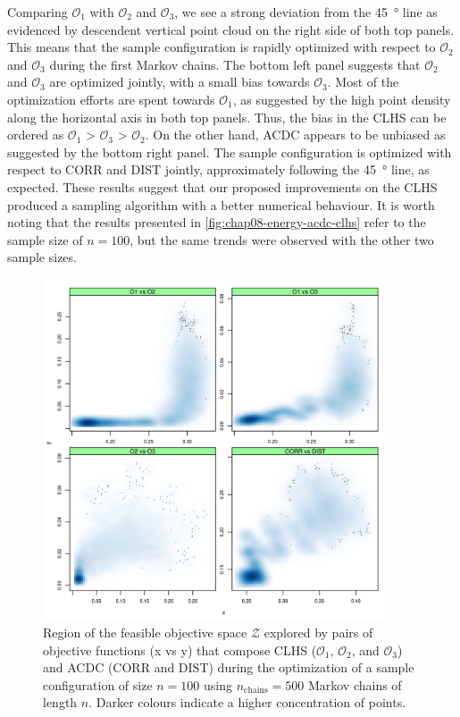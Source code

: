 Comparing $\mathcal{O}_1$ with $\mathcal{O}_2$ and $\mathcal{O}_3$, we see a strong deviation from the 
\SI{45}{\degree} line as evidenced by descendent vertical point cloud on the right side of both top panels. 
This means that the sample configuration is rapidly optimized with respect to $\mathcal{O}_2$ and 
$\mathcal{O}_3$ during the first Markov chains. The bottom left panel suggests that $\mathcal{O}_2$ and 
$\mathcal{O}_3$ are optimized jointly, with a small bias towards $\mathcal{O}_3$. Most of the optimization 
efforts are spent towards $\mathcal{O}_1$, as suggested by the high point density along the horizontal axis in 
both 
top panels. Thus, the bias in the CLHS can be ordered as $\mathcal{O}_1$ > $\mathcal{O}_3$ > $\mathcal{O}_2$. 
On the other hand, ACDC appears to be unbiased as suggested by the bottom right panel. The sample configuration 
is optimized with respect to CORR and DIST jointly, approximately following the \SI{45}{\degree} line, as 
expected. These results suggest that our proposed improvements on the CLHS produced a sampling algorithm with a 
better numerical behaviour. It is worth noting that the results presented in 
\autoref{fig:chap08-energy-acdc-clhs} refer to the sample size of $n = 100$, but the same trends were observed 
with the other two sample sizes.

\begin{figure}[!ht]
 \centering
 \includegraphics[width=0.90\textwidth]{fig/chap08-energy-acdc-clhs}
 \caption[Region of the feasible objective space explored by pairs of objective functions that compose CLHS 
 and ACDC.]{Region of the feasible objective space $\mathcal{Z}$ explored by pairs of objective functions (x 
 vs  y) that compose CLHS ($\mathcal{O}_1$, $\mathcal{O}_2$, and $\mathcal{O}_3$) and ACDC (CORR and DIST)  
 during the optimization of a sample configuration of size $n = 100$ using $n_{\text{chains}} = 500$ Markov 
 chains of length $n$. Darker colours indicate a higher concentration of points.}
 \label{fig:chap08-energy-acdc-clhs}
\end{figure}

